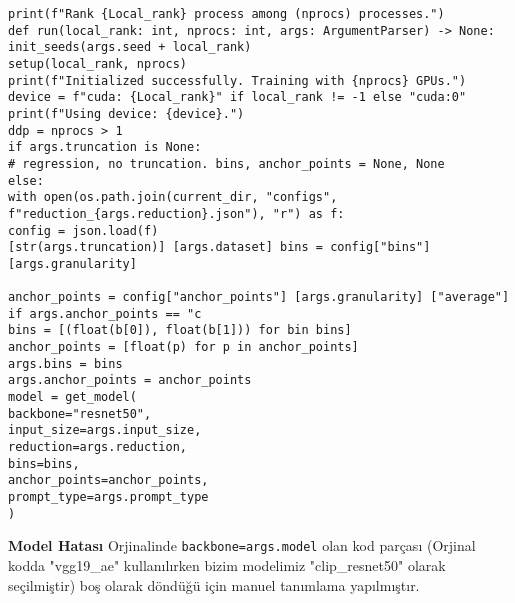 \documentclass[10pt,a4paper]{report}
\begin{document}
	\begin{verbatim}
print(f"Rank {Local_rank} process among (nprocs) processes.") 
def run(local_rank: int, nprocs: int, args: ArgumentParser) -> None:
init_seeds(args.seed + local_rank) 
setup(local_rank, nprocs) 
print(f"Initialized successfully. Training with {nprocs} GPUs.") 
device = f"cuda: {Local_rank}" if local_rank != -1 else "cuda:0" 
print(f"Using device: {device}.") 
ddp = nprocs > 1 
if args.truncation is None: 
# regression, no truncation. bins, anchor_points = None, None 
else: 
with open(os.path.join(current_dir, "configs", 
f"reduction_{args.reduction}.json"), "r") as f: 
config = json.load(f) 
[str(args.truncation)] [args.dataset] bins = config["bins"] [args.granularity]
	
anchor_points = config["anchor_points"] [args.granularity] ["average"] 
if args.anchor_points == "c 
bins = [(float(b[0]), float(b[1])) for bin bins] 
anchor_points = [float(p) for p in anchor_points] 
args.bins = bins 
args.anchor_points = anchor_points 
model = get_model(
backbone="resnet50",
input_size=args.input_size,
reduction=args.reduction,
bins=bins,
anchor_points=anchor_points,
prompt_type=args.prompt_type
)
\end{verbatim}
\textbf{Model Hatası}\newline
Orjinalinde \texttt{backbone=args.model} olan kod parçası (Orjinal kodda "vgg19\_ae" kullanılırken bizim modelimiz "clip\_resnet50" olarak seçilmiştir) boş olarak döndüğü için manuel tanımlama yapılmıştır.
\end{document}
